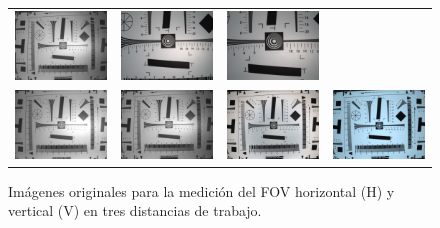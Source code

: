 \begin{figure}[H]
\begin{tabular}{cccc}
         \includegraphics[trim= 6cm 6cm 6cm 6cm, clip, width=.22\linewidth]{Figures/C4/FOV/NIR/V/65.png} & %
         \includegraphics[width=.22\linewidth]{Figures/C4/FOV/VIS/H/37_8.png} &
         \includegraphics[width=.22\linewidth]{Figures/C4/FOV/VIS/V/30_3.png} \\
         \includegraphics[width=.22\linewidth]{Figures/C4/FOV/NIR/H/63.png} &
         \includegraphics[width=.22\linewidth]{Figures/C4/FOV/NIR/V/65.png} &
         \includegraphics[width=.22\linewidth]{Figures/C4/FOV/VIS/H/69_4.png} &
         \includegraphics[width=.22\linewidth]{Figures/C4/FOV/VIS/V/70.png} \\
       \end{tabular}
       \caption{Imágenes originales para la medición del FOV horizontal (H)
                y vertical (V) en tres distancias de trabajo.}
       \label{fig:fov_montage}
     \end{figure}
     
